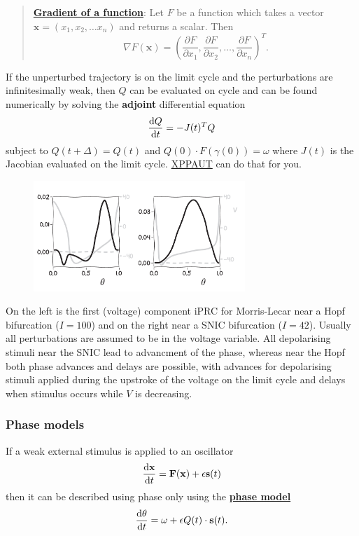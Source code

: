 \documentclass[11pt]{article}
\begin{document}
\begin{quote}
\textbf{\href{https://en.wikipedia.org/wiki/Gradient}{Gradient of a
function}}: Let \(F\) be a function which takes a vector
\(\mathbf{x}= (x_1, x_2, \ldots x_n)\) and returns a scalar. Then
\[\nabla F(\mathbf{x}) = \left( \frac{\partial F}{\partial x_1}, \frac{\partial F}{\partial x_2}, \ldots, \frac{\partial F}{\partial x_n}\right)^T.\]
\end{quote}

If the unperturbed trajectory is on the limit cycle and the
perturbations are infinitesimally weak, then \(Q\) can be evaluated on
cycle and can be found numerically by solving the \textbf{adjoint}
differential equation \[ \frac{{\rm d} Q}{{\rm d}t} = - J(t)^T Q\]
subject to \(Q(t+\Delta)=Q(t)\) and \(Q(0) \cdot F(\gamma(0))= \omega\)
where \(J(t)\) is the Jacobian evaluated on the limit cycle.
\href{https://sites.pitt.edu/~phase/bard/bardware/xpp/xpp.html}{XPPAUT}
can do that for you.

 \begin{figure}[!h]
  \centering
  \includegraphics[width=8cm]{iPRCs.png}
\end{figure}


On the left is the first (voltage) component iPRC for Morris-Lecar near
a Hopf bifurcation (\(I=100\)) and on the right near a SNIC bifurcation
(\(I=42\)). Usually all perturbations are assumed to be in the voltage
variable. All depolarising stimuli near the SNIC lead to advancment of
the phase, whereas near the Hopf both phase advances and delays are
possible, with advances for depolarising stimuli applied during the
upstroke of the voltage on the limit cycle and delays when stimulus
occurs while \(V\) is decreasing.

    \hypertarget{phase-models}{%
\subsubsection{Phase models}\label{phase-models}}

If a weak external stimulus is applied to an oscillator
\[\frac{{\rm d} \mathbf{x}}{{\rm d} t} = \mathbf{F}(\mathbf{x}) + \epsilon \mathbf{s}(t)\]
then it can be described using phase only using the
\href{http://www.scholarpedia.org/article/Phase_model}{\textbf{phase
model}}
\[ \frac{{\rm d}\theta}{{\rm d} t} = \omega + \epsilon Q(t) \cdot \mathbf{s}(t).\]
\end{document}
